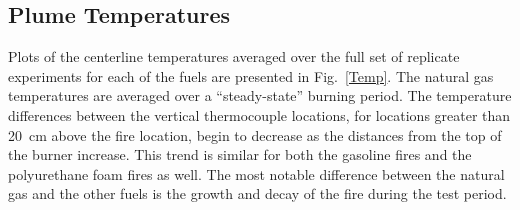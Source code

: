 \documentclass[twoside]{uocthesis}
\begin{document}
{\subsection{Plume Temperatures}

Plots of the centerline temperatures averaged over the full set of replicate experiments for each of the fuels are presented in Fig.~\ref{Temp}. The natural gas temperatures are averaged over a ``steady-state'' burning period.  The temperature differences between the vertical thermocouple locations, for locations greater than 20~cm above the fire location, begin to decrease as the distances from the top of the burner increase.  This trend is similar for both the gasoline fires and the polyurethane foam fires as well.  The most notable difference between the natural gas and the other fuels is the growth and decay of the fire during the test period.

}
\end{document}
